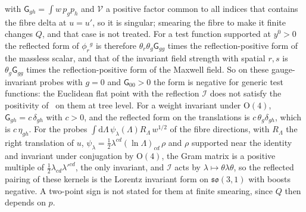 with \(\mathsf G_{gh}=\int w\,p_gp_h\) and \(\mathcal V\) a positive factor common to all indices that contains the fibre delta at \(u=u'\), so it is singular; smearing the fibre to make it finite changes \(Q\), and that case is not treated. For a test function supported at \(y^0>0\) the reflected form of \(\phi_r{}^g\) is therefore \(\theta_r\theta_g\mathsf G_{gg}\) times the reflection-positive form of the massless scalar, and that of the invariant field strength with spatial \(r,s\) is \(\theta_g\mathsf G_{gg}\) times the reflection-positive form of the Maxwell field. So on these gauge-invariant probes with \(g=0\) and \(\mathsf G_{00}>0\) the form is negative for generic test functions: the Euclidean flat point with the reflection \(\mathcal I\) does not satisfy the positivity of~\cite{OsterwalderSchrader1973,OsterwalderSchrader1975} on them at tree level. For a weight invariant under \(\mathrm O(4)\), \(\mathsf G_{gh}=c\,\delta_{gh}\) with \(c>0\), and the reflected form on the translations is \(c\,\theta_g\delta_{gh}\), which is \(c\,\eta_{gh}\). For the probes \(\int\mathrm d\Lambda\,\psi_\lambda(\Lambda)R_\Lambda\,w^{1/2}\) of the fibre directions, with \(R_\Lambda\) the right translation of \(u\), \(\psi_\lambda=\tfrac12\lambda^{cd}(\ln\Lambda)_{cd}\,\rho\) and \(\rho\) supported near the identity and invariant under conjugation by \(\mathrm O(4)\), the Gram matrix is a positive multiple of \(\tfrac12\lambda_{cd}\lambda'^{cd}\), the only invariant, and \(\mathcal I\) acts by \(\lambda\mapsto\theta\lambda\theta\), so the reflected pairing of these kernels is the Lorentz invariant form on \(\mathfrak{so}(3,1)\) with boosts negative. A two-point sign is not stated for them at finite smearing, since \(Q\) then depends on \(p\).

